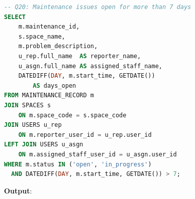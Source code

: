 \begin{lstlisting}[language=SQL]
-- Q20: Maintenance issues open for more than 7 days
SELECT
    m.maintenance_id,
    s.space_name,
    m.problem_description,
    u_rep.full_name  AS reporter_name,
    u_asgn.full_name AS assigned_staff_name,
    DATEDIFF(DAY, m.start_time, GETDATE())
        AS days_open
FROM MAINTENANCE_RECORD m
JOIN SPACES s
    ON m.space_code = s.space_code
JOIN USERS u_rep
    ON m.reporter_user_id = u_rep.user_id
LEFT JOIN USERS u_asgn
    ON m.assigned_staff_user_id = u_asgn.user_id
WHERE m.status IN ('open', 'in_progress')
  AND DATEDIFF(DAY, m.start_time, GETDATE()) > 7;
\end{lstlisting}
\textbf{Output}:
\begin{table}[htbp]
\centering
{}
\end{table}